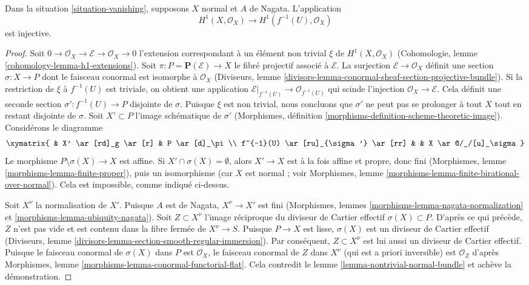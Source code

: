 \begin{lemma} \label{lemma-H1-injective} Dans la situation \ref{situation-vanishing}, supposons $X$ normal et $A$ de Nagata. L'application $$
H^1(X, \mathcal{O}_X) \longrightarrow H^1(f^{-1}(U), \mathcal{O}_X)
$$ est injective. \end{lemma}

\begin{proof} Soit $0 \to \mathcal{O}_X \to \mathcal{E} \to \mathcal{O}_X \to 0$ l'extension correspondant à un élément non trivial $\xi$ de $H^1(X, \mathcal{O}_X)$ (Cohomologie, lemme \ref{cohomology-lemma-h1-extensions}). Soit $\pi : P = \mathbf{P}(\mathcal{E}) \to X$ le fibré projectif associé à $\mathcal{E}$. La surjection $\mathcal{E} \to \mathcal{O}_X$ définit une section $\sigma : X \to P$ dont le faisceau conormal est isomorphe à $\mathcal{O}_X$ (Diviseurs, lemme \ref{divisors-lemma-conormal-sheaf-section-projective-bundle}). Si la restriction de $\xi$ à $f^{-1}(U)$ est triviale, on obtient une application $\mathcal{E}|_{f^{-1}(U)} \to \mathcal{O}_{f^{-1}(U)}$ qui scinde l'injection $\mathcal{O}_X \to \mathcal{E}$. Cela définit une seconde section $\sigma' : f^{-1}(U) \to P$ disjointe de $\sigma$. Puisque $\xi$ est non trivial, nous concluons que $\sigma'$ ne peut pas se prolonger à tout $X$ tout en restant disjointe de $\sigma$. Soit $X' \subset P$ l'image schématique de $\sigma'$ (Morphismes, définition \ref{morphisms-definition-scheme-theoretic-image}). Considérons le diagramme $$
\xymatrix{
& X' \ar[rd]_g \ar[r] & P \ar[d]_\pi \\
f^{-1}(U) \ar[ru]_{\sigma'} \ar[rr] & & X \ar@/_/[u]_\sigma
}
$$ Le morphisme $P \setminus \sigma(X) \to X$ est affine. Si $X' \cap \sigma(X) = \emptyset$, alors $X' \to X$ est à la fois affine et propre, donc fini (Morphismes, lemme \ref{morphisms-lemma-finite-proper}), puis un isomorphisme (car $X$ est normal ; voir Morphismes, lemme \ref{morphisms-lemma-finite-birational-over-normal}). Cela est impossible, comme indiqué ci-dessus.

\medskip\noindent Soit $X^\nu$ la normalisation de $X'$. Puisque $A$ est de Nagata, $X^\nu \to X'$ est fini (Morphismes, lemmes \ref{morphisms-lemma-nagata-normalization} et \ref{morphisms-lemma-ubiquity-nagata}). Soit $Z \subset X^\nu$ l'image réciproque du diviseur de Cartier effectif $\sigma(X) \subset P$. D'après ce qui précède, $Z$ n'est pas vide et est contenu dans la fibre fermée de $X^\nu \to S$. Puisque $P \to X$ est lisse, $\sigma(X)$ est un diviseur de Cartier effectif (Diviseurs, lemme \ref{divisors-lemma-section-smooth-regular-immersion}). Par conséquent, $Z \subset X^\nu$ est lui aussi un diviseur de Cartier effectif. Puisque le faisceau conormal de $\sigma(X)$ dans $P$ est $\mathcal{O}_X$, le faisceau conormal de $Z$ dans $X^\nu$ (qui est a priori inversible) est $\mathcal{O}_Z$ d'après Morphismes, lemme \ref{morphisms-lemma-conormal-functorial-flat}. Cela contredit le lemme \ref{lemma-nontrivial-normal-bundle} et achève la démonstration. \end{proof}


